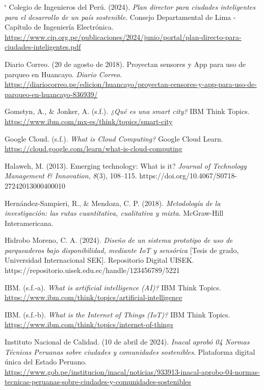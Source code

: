 \documentclass[12pt,a4paper]{article}
\makeatletter
\renewenvironment{thebibliography}[1]{%
	\list{}{%
		\setlength{\leftmargin}{1.27cm}%
		\setlength{\itemindent}{-1.27cm}%
		\setlength{\labelwidth}{0pt}%
		\setlength{\labelsep}{0pt}%
		\usecounter{enumiv}%
		\let\p@enumiv\@empty
		\renewcommand\theenumiv{\@arabic\c@enumiv}}%
	\sloppy\clubpenalty4000\widowpenalty4000\sfcode`\.\@m}
	{\endlist}
\makeatother
\begin{document}
\begin{thebibliography}{99}
	Colegio de Ingenieros del Perú. (2024).
	\textit{Plan director para ciudades inteligentes para el desarrollo de un país sostenible}.
	Consejo Departamental de Lima - Capítulo de Ingeniería Electrónica.
	\url{https://www.cip.org.pe/publicaciones/2024/junio/portal/plan-directo-para-ciudades-inteligentes.pdf}
	
	Diario Correo. (20 de agosto de 2018).
	Proyectan sensores y App para uso de parqueo en Huancayo.
	\textit{Diario Correo}.
	\url{https://diariocorreo.pe/edicion/huancayo/proyectan-censores-y-app-para-uso-de-parqueo-en-huancayo-836939/}
	
	Gomstyn, A., \& Jonker, A. (s.f.).
	\textit{¿Qué es una smart city?}
	IBM Think Topics.
	\url{https://www.ibm.com/mx-es/think/topics/smart-city}
	
	Google Cloud. (s.f.).
	\textit{What is Cloud Computing?}
	Google Cloud Learn.
	\url{https://cloud.google.com/learn/what-is-cloud-computing}
	
	Halaweh, M. (2013).
	Emerging technology: What is it?
	\textit{Journal of Technology Management \& Innovation}, \textit{8}(3), 108--115.
	https://doi.org/10.4067/S0718-27242013000400010
	
	Hernández-Sampieri, R., \& Mendoza, C. P. (2018).
	\textit{Metodología de la investigación: las rutas cuantitativa, cualitativa y mixta}.
	McGraw-Hill Interamericana.
	
	Hidrobo Moreno, C. A. (2024).
	\textit{Diseño de un sistema prototipo de uso de parqueaderos bajo disponibilidad, mediante IoT y sensórica}
	[Tesis de grado, Universidad Internacional SEK].
	Repositorio Digital UISEK.
	https://repositorio.uisek.edu.ec/handle/123456789/5221
	
	IBM. (s.f.-a).
	\textit{What is artificial intelligence (AI)?}
	IBM Think Topics.
	\url{https://www.ibm.com/think/topics/artificial-intelligence}
	
	IBM. (s.f.-b).
	\textit{What is the Internet of Things (IoT)?}
	IBM Think Topics.
	\url{https://www.ibm.com/think/topics/internet-of-things}
	
	Instituto Nacional de Calidad. (10 de abril de 2024).
	\textit{Inacal aprobó 04 Normas Técnicas Peruanas sobre ciudades y comunidades sostenibles}.
	Plataforma digital única del Estado Peruano.
	\url{https://www.gob.pe/institucion/inacal/noticias/933913-inacal-aprobo-04-normas-tecnicas-peruanas-sobre-ciudades-y-comunidades-sostenibles}
	

\end{thebibliography}
\end{document}

